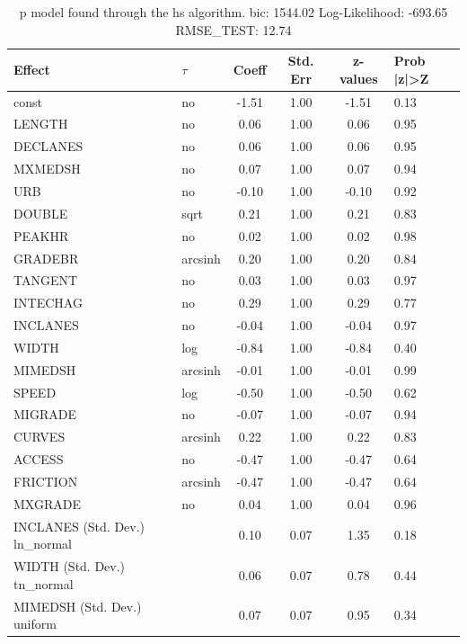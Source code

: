 \begin{table}
	\caption{p model found through the hs algorithm. bic: 1544.02 Log-Likelihood: -693.65 RMSE_TEST: 12.74}
	\begin{center}
		\begin{tabular}{|l|l|c|c|c|l|}
			\hline
			Effect & $\tau$ & Coeff & Std. Err & z-values & Prob |z|>Z \\
			\hline
			const & no & -1.51 & 1.00 & -1.51 & 0.13 \\
			\hline
			LENGTH & no & 0.06 & 1.00 & 0.06 & 0.95 \\
			\hline
			DECLANES & no & 0.06 & 1.00 & 0.06 & 0.95 \\
			\hline
			MXMEDSH & no & 0.07 & 1.00 & 0.07 & 0.94 \\
			\hline
			URB & no & -0.10 & 1.00 & -0.10 & 0.92 \\
			\hline
			DOUBLE & sqrt & 0.21 & 1.00 & 0.21 & 0.83 \\
			\hline
			PEAKHR & no & 0.02 & 1.00 & 0.02 & 0.98 \\
			\hline
			GRADEBR & arcsinh & 0.20 & 1.00 & 0.20 & 0.84 \\
			\hline
			TANGENT & no & 0.03 & 1.00 & 0.03 & 0.97 \\
			\hline
			INTECHAG & no & 0.29 & 1.00 & 0.29 & 0.77 \\
			\hline
			INCLANES & no & -0.04 & 1.00 & -0.04 & 0.97 \\
			\hline
			WIDTH & log & -0.84 & 1.00 & -0.84 & 0.40 \\
			\hline
			MIMEDSH & arcsinh & -0.01 & 1.00 & -0.01 & 0.99 \\
			\hline
			SPEED & log & -0.50 & 1.00 & -0.50 & 0.62 \\
			\hline
			MIGRADE & no & -0.07 & 1.00 & -0.07 & 0.94 \\
			\hline
			CURVES & arcsinh & 0.22 & 1.00 & 0.22 & 0.83 \\
			\hline
			ACCESS & no & -0.47 & 1.00 & -0.47 & 0.64 \\
			\hline
			FRICTION & arcsinh & -0.47 & 1.00 & -0.47 & 0.64 \\
			\hline
			MXGRADE & no & 0.04 & 1.00 & 0.04 & 0.96 \\
			\hline
			INCLANES (Std. Dev.) ln_normal &  & 0.10 & 0.07 & 1.35 & 0.18 \\
			\hline
			WIDTH (Std. Dev.) tn_normal &  & 0.06 & 0.07 & 0.78 & 0.44 \\
			\hline
			MIMEDSH (Std. Dev.) uniform &  & 0.07 & 0.07 & 0.95 & 0.34 \\

\end{tabular}
\end{center}
\end{table}
